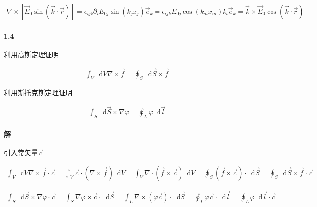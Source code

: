 \documentclass{article}
\newcommand*{\md}{\mathop{}\!\mathrm{d}}
\begin{document}
\begin{equation*}
  \begin{aligned}
    \nabla \times \left[ \vec{E}_0 \sin \left( \vec{k} \cdot \vec{r} \right) \right] = \epsilon_{ijk} \partial_i E_{0j} \sin \left( k_j x_j \right) \vec{e}_k = \epsilon_{ijk} E_{0j} \cos \left( k_m x_m \right) k_i \vec{e}_k = \vec{k} \times \vec{E}_0 \cos \left( \vec{k} \cdot \vec{r} \right)
  \end{aligned}
\end{equation*}

\paragraph{1.4}

利用高斯定理证明

\begin{equation*}
  \begin{aligned}
    \int_V \md V \nabla \times \vec{f} = \oint_S \md \vec{S} \times \vec{f} 
  \end{aligned}
\end{equation*}

利用斯托克斯定理证明

\begin{equation*}
  \begin{aligned}
    \int_S \md \vec{S} \times \nabla \varphi = \oint_L \varphi \md \vec{l}
  \end{aligned}
\end{equation*}

\paragraph{解}

引入常矢量$\vec{c}$

\begin{equation*}
  \begin{aligned}
    \int_V \md V \nabla \times \vec{f} \cdot \vec{c} = \int_V \vec{c} \cdot \left( \nabla \times \vec{f} \right) \md V = \int_V \nabla \cdot \left( \vec{f} \times \vec{c} \right) \md V = \oint_S \left( \vec{f} \times \vec{c} \right) \cdot \md \vec{S} = \oint_S \md \vec{S} \times \vec{f} \cdot \vec{c}
  \end{aligned}
\end{equation*}

\begin{equation*}
  \begin{aligned}
    \int_S \md \vec{S} \times \nabla \varphi \cdot \vec{c} = \int_S \nabla \varphi \times \vec{c} \cdot \md \vec{S} = \int_L \nabla \times \left( \varphi \vec{c} \right) \cdot \md \vec{S} = \oint_L \varphi \vec{c} \cdot \md \vec{l} = \oint_L \varphi \md \vec{l} \cdot \vec{c}
  \end{aligned}
\end{equation*}
\end{document}

